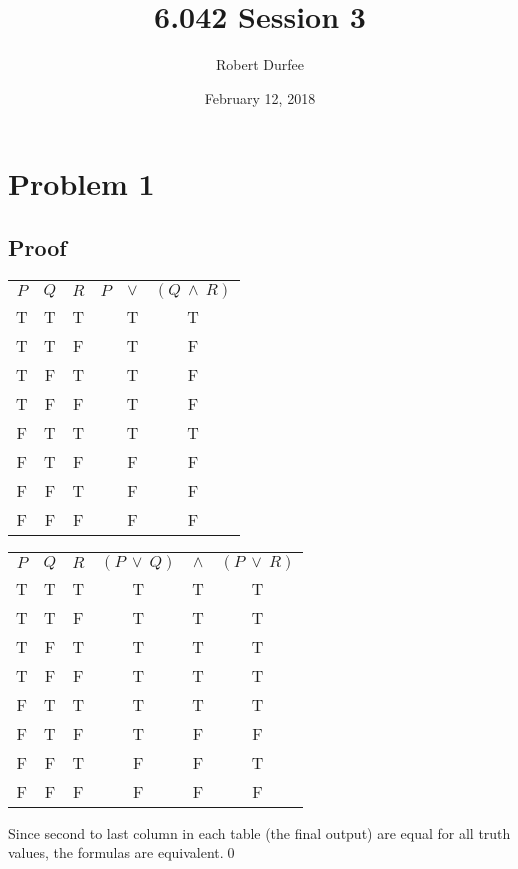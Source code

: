 \documentclass{article}
\title{ 6.042 Session 3 }
\author{ Robert Durfee }
\date{ February 12, 2018 }
\begin{document}
\maketitle

\section*{Problem 1}

\subsection*{Proof}

\begin{center}
  \begin{tabular}{ c c c c c c }
    $P$ & $Q$ & $R$ & $P$ & $\lor$ & $(Q\ \land\ R)$ \\
    T & T & T & & T & T \\
    T & T & F & & T & F \\
    T & F & T & & T & F \\
    T & F & F & & T & F \\
    F & T & T & & T & T \\
    F & T & F & & F & F \\
    F & F & T & & F & F \\
    F & F & F & & F & F \\
  \end{tabular}
\end{center}

\begin{center}
  \begin{tabular}{ c c c c c c }
    $P$ & $Q$ & $R$ & $(P\ \lor\ Q)$ & $\land$ & $(P\ \lor\ R)$ \\
    T & T & T & T & T & T\\
    T & T & F & T & T & T\\
    T & F & T & T & T & T\\
    T & F & F & T & T & T\\
    F & T & T & T & T & T\\
    F & T & F & T & F & F\\
    F & F & T & F & F & T\\
    F & F & F & F & F & F\\
  \end{tabular}
\end{center}

Since second to last column in each table (the final output) are equal for all
truth values, the formulas are equivalent.\qed
\end{document}
